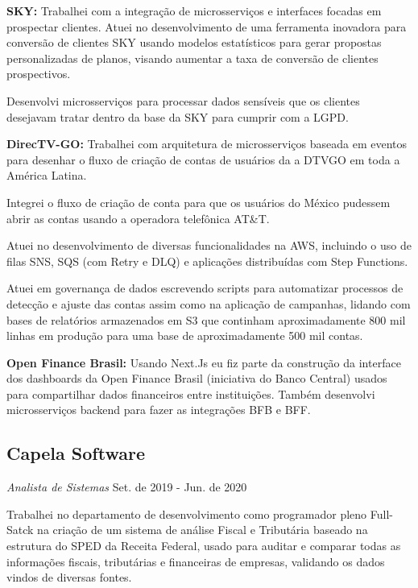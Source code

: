 \documentclass[a4paper,10pt]{article}
\begin{document}

\vspace{2mm} \textcolor{corSubSection}{\bfseries{SKY:}}
Trabalhei com a integração de microsserviços e interfaces focadas em prospectar clientes.
Atuei no desenvolvimento de uma ferramenta inovadora para conversão de clientes SKY
usando modelos estatísticos para gerar propostas personalizadas de planos,
visando aumentar a taxa de conversão de clientes prospectivos. 

Desenvolvi microsserviços para processar dados sensíveis que os clientes
desejavam tratar dentro da base da SKY para cumprir com a LGPD.

\vspace{2mm} \textcolor{corSubSection}{\bfseries{DirecTV-GO:}}
Trabalhei com arquitetura de microsserviços baseada em eventos
para desenhar o fluxo de criação de contas de usuários
da a DTVGO em toda a América Latina.

Integrei o fluxo de criação de conta para que os usuários do México
pudessem abrir as contas usando a operadora telefônica AT\&T.

Atuei no desenvolvimento de diversas funcionalidades na AWS,
incluindo o uso de filas SNS, SQS (com Retry e DLQ)
e aplicações distribuídas com Step Functions.

Atuei em governança de dados escrevendo scripts
para automatizar processos de detecção e ajuste das contas
assim como na aplicação de campanhas,
lidando com bases de relatórios armazenados em S3 que continham aproximadamente
800 mil linhas em produção para uma base de aproximadamente 500 mil contas.

\vspace{2mm} \textcolor{corSubSection}{\bfseries{Open Finance Brasil:}}
Usando Next.Js eu fiz parte da construção da interface dos dashboards
da Open Finance Brasil (iniciativa do Banco Central)
usados para compartilhar dados financeiros entre instituições.
Também desenvolvi microsserviços backend para fazer as integrações BFB e BFF.

\subsection*{Capela Software}
\textcolor{corSubSection}{\emph{Analista de Sistemas}}
\hfill\textcolor{corSubSection}{Set. de 2019 - Jun. de 2020}

Trabalhei no departamento de desenvolvimento como programador pleno Full-Satck
na criação de um sistema de análise Fiscal e Tributária
baseado na estrutura do SPED da Receita Federal,
usado para auditar e comparar todas as informações fiscais,
tributárias e financeiras de empresas,
validando os dados vindos de diversas fontes.
\end{document}

